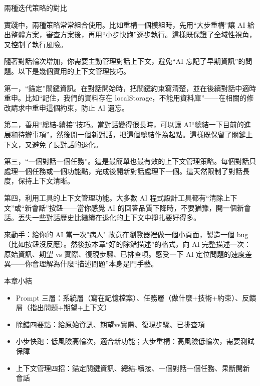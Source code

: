 \begin{center}\small\color{gray}兩種迭代策略的對比\end{center}

實踐中，兩種策略常常組合使用。比如重構一個模組時，先用“大步重構”讓 AI 給出整體方案，審查方案後，再用“小步快跑”逐步執行。這樣既保證了全域性視角，又控制了執行風險。


隨著對話輪次增加，你需要主動管理對話上下文，避免“AI 忘記了早期資訊”的問題。以下是幾個實用的上下文管理技巧。

第一，“錨定”關鍵資訊。在對話開始時，把關鍵約束寫清楚，並在後續對話中適時重申。比如“記住，我們的資料存在 localStorage，不能用資料庫”——在相關的修改請求中重申這個約束，防止 AI 遺忘。

第二，善用“總結-續接”技巧。當對話變得很長時，可以讓 AI“總結一下目前的進展和待辦事項”，然後開一個新對話，把這個總結作為起點。這樣既保留了關鍵上下文，又避免了長對話的退化。

第三，“一個對話一個任務”。這是最簡單也最有效的上下文管理策略。每個對話只處理一個任務或一個功能點，完成後開新對話處理下一個。這天然限制了對話長度，保持上下文清晰。

第四，利用工具的上下文管理功能。大多數 AI 程式設計工具都有“清除上下文”或“新會話”按鈕——當你感覺 AI 的回答品質下降時，不要猶豫，開一個新會話。丟失一些對話歷史比繼續在退化的上下文中掙扎要好得多。

\begin{tcbpractice}{來動手：給你的 AI 當一次"病人"}
故意在瀏覽器裡做一個小頁面，製造一個 bug（比如按鈕沒反應）。然後按本章“好的除錯描述”的格式，向 AI 完整描述一次：原始資訊、期望 vs 實際、復現步驟、已排查項。感受一下 AI 定位問題的速度差異——你會理解為什麼“描述問題”本身是門手藝。

\end{tcbpractice}

\begin{tcbsummary}{本章小結}
\begin{itemize}
  \item Prompt 三層：系統層（寫在記憶檔案）、任務層（做什麼+技術+約束）、反饋層（指出問題+期望+上下文）
  \item 除錯四要點：給原始資訊、期望vs實際、復現步驟、已排查項
  \item 小步快跑：低風險高輪次，適合新功能；大步重構：高風險低輪次，需要測試保障
  \item 上下文管理四招：錨定關鍵資訊、總結-續接、一個對話一個任務、果斷開新會話
\end{itemize}

\end{tcbsummary}
